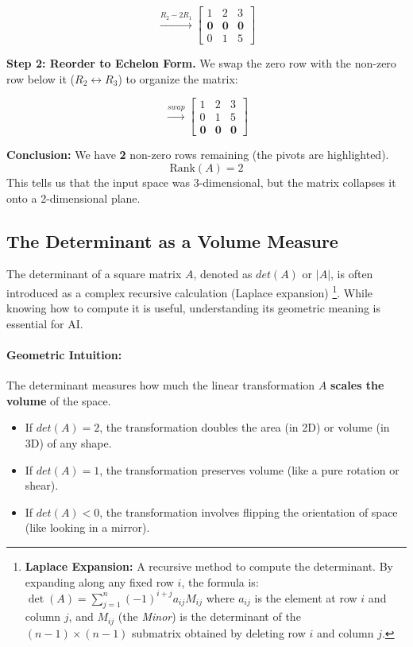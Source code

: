 \documentclass[12pt,a4paper,twoside,openright]{book}
\begin{document}
\begin{equation*}
\xrightarrow{R_2 - 2R_1}
\begin{bmatrix}
1 & 2 & 3 \\
\mathbf{0} & \mathbf{0} & \mathbf{0} \\
0 & 1 & 5
\end{bmatrix}
\end{equation*}

\textbf{Step 2: Reorder to Echelon Form.}
We swap the zero row with the non-zero row below it ($R_2 \leftrightarrow R_3$) to organize the matrix:

\begin{equation*}
\xrightarrow{swap}
\begin{bmatrix}
1 & 2 & 3 \\
0 & 1 & 5 \\
\mathbf{0} & \mathbf{0} & \mathbf{0}
\end{bmatrix}
\end{equation*}

\textbf{Conclusion:}
We have \textbf{2} non-zero rows remaining (the pivots are highlighted).
\[
\text{Rank}(A) = 2
\]
This tells us that the input space was 3-dimensional, but the matrix collapses it onto a 2-dimensional plane.

\subsection{The Determinant as a Volume Measure}

The determinant of a square matrix $A$, denoted as $det(A)$ or $|A|$, is often introduced as a complex recursive calculation (Laplace expansion) \footnote{\textbf{Laplace Expansion:} A recursive method to compute the determinant. By expanding along any fixed row $i$, the formula is:
$ \det(A) = \sum_{j=1}^{n} (-1)^{i+j} a_{ij} M_{ij} $
where $a_{ij}$ is the element at row $i$ and column $j$, and $M_{ij}$ (the \textit{Minor}) is the determinant of the $(n-1) \times (n-1)$ submatrix obtained by deleting row $i$ and column $j$.}. While knowing how to compute it is useful, understanding its geometric meaning is essential for AI.

\paragraph{Geometric Intuition:}
The determinant measures how much the linear transformation $A$ \textbf{scales the volume} of the space.
\begin{itemize}
    \item If $det(A) = 2$, the transformation doubles the area (in 2D) or volume (in 3D) of any shape.
    \item If $det(A) = 1$, the transformation preserves volume (like a pure rotation or shear).
    \item If $det(A) < 0$, the transformation involves flipping the orientation of space (like looking in a mirror).
\end{itemize}
\end{document}
